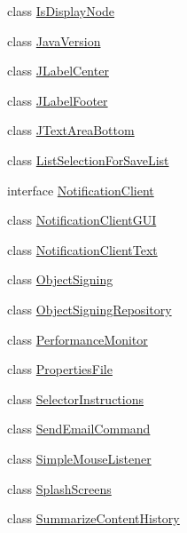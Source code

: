 \begin{DoxyCompactItemize}
class \hyperlink{classgov_1_1fnal_1_1ppd_1_1dd_1_1util_1_1IsDisplayNode}{Is\-Display\-Node}
\item 
class \hyperlink{classgov_1_1fnal_1_1ppd_1_1dd_1_1util_1_1JavaVersion}{Java\-Version}
\item 
class \hyperlink{classgov_1_1fnal_1_1ppd_1_1dd_1_1util_1_1JLabelCenter}{J\-Label\-Center}
\item 
class \hyperlink{classgov_1_1fnal_1_1ppd_1_1dd_1_1util_1_1JLabelFooter}{J\-Label\-Footer}
\item 
class \hyperlink{classgov_1_1fnal_1_1ppd_1_1dd_1_1util_1_1JTextAreaBottom}{J\-Text\-Area\-Bottom}
\item 
class \hyperlink{classgov_1_1fnal_1_1ppd_1_1dd_1_1util_1_1ListSelectionForSaveList}{List\-Selection\-For\-Save\-List}
\item 
interface \hyperlink{interfacegov_1_1fnal_1_1ppd_1_1dd_1_1util_1_1NotificationClient}{Notification\-Client}
\item 
class \hyperlink{classgov_1_1fnal_1_1ppd_1_1dd_1_1util_1_1NotificationClientGUI}{Notification\-Client\-G\-U\-I}
\item 
class \hyperlink{classgov_1_1fnal_1_1ppd_1_1dd_1_1util_1_1NotificationClientText}{Notification\-Client\-Text}
\item 
class \hyperlink{classgov_1_1fnal_1_1ppd_1_1dd_1_1util_1_1ObjectSigning}{Object\-Signing}
\item 
class \hyperlink{classgov_1_1fnal_1_1ppd_1_1dd_1_1util_1_1ObjectSigningRepository}{Object\-Signing\-Repository}
\item 
class \hyperlink{classgov_1_1fnal_1_1ppd_1_1dd_1_1util_1_1PerformanceMonitor}{Performance\-Monitor}
\item 
class \hyperlink{classgov_1_1fnal_1_1ppd_1_1dd_1_1util_1_1PropertiesFile}{Properties\-File}
\item 
class \hyperlink{classgov_1_1fnal_1_1ppd_1_1dd_1_1util_1_1SelectorInstructions}{Selector\-Instructions}
\item 
class \hyperlink{classgov_1_1fnal_1_1ppd_1_1dd_1_1util_1_1SendEmailCommand}{Send\-Email\-Command}
\item 
class \hyperlink{classgov_1_1fnal_1_1ppd_1_1dd_1_1util_1_1SimpleMouseListener}{Simple\-Mouse\-Listener}
\item 
class \hyperlink{classgov_1_1fnal_1_1ppd_1_1dd_1_1util_1_1SplashScreens}{Splash\-Screens}
\item 
class \hyperlink{classgov_1_1fnal_1_1ppd_1_1dd_1_1util_1_1SummarizeContentHistory}{Summarize\-Content\-History}

\end{DoxyCompactItemize}
